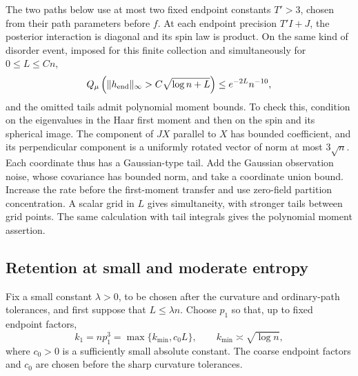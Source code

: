The two paths below use at most two fixed endpoint constants $T'>3$,
chosen from their path parameters before $f$. At each endpoint precision
$T'I+J$, the posterior interaction is diagonal and its spin law is product.
On the same kind of disorder event, imposed for this finite collection and
simultaneously for $0\le L\le Cn$,
\begin{equation}\label{cap:product-field-tail}
 Q_\mu\left(\|h_{\rm end}\|_\infty>
                         C\sqrt{\log n+L}\right)
 \le e^{-2L}n^{-10},
\end{equation}
and the omitted tails admit polynomial moment bounds. To check this, condition
on the eigenvalues in the Haar first moment and then on the spin and its
spherical image. The component of $JX$ parallel to $X$ has bounded
coefficient, and its perpendicular component is a uniformly rotated vector of
norm at most $3\sqrt n$. Each coordinate thus has a Gaussian-type tail. Add
the Gaussian observation noise, whose covariance has bounded norm, and take a
coordinate union bound. Increase the rate before the first-moment transfer and
use zero-field partition concentration. A scalar grid in $L$ gives
simultaneity, with stronger tails between grid points. The same calculation
with tail integrals gives the polynomial moment assertion.

\subsection{Retention at small and moderate entropy}\label{cap:entropy-retention}

Fix a small constant $\lambda>0$, to be chosen after the curvature and
ordinary-path tolerances, and first suppose that $L\le\lambda n$. Choose $p_1$
so that, up to fixed endpoint factors,
\begin{equation}\label{cap:first-entropy-scale}
 k_1=np_1^3=\max\{k_{\min},c_0L\},\qquad
 k_{\min}\asymp\sqrt{\log n},
\end{equation}
where $c_0>0$ is a sufficiently small absolute constant.  The coarse
endpoint factors and $c_0$ are chosen before the sharp curvature
tolerances.

